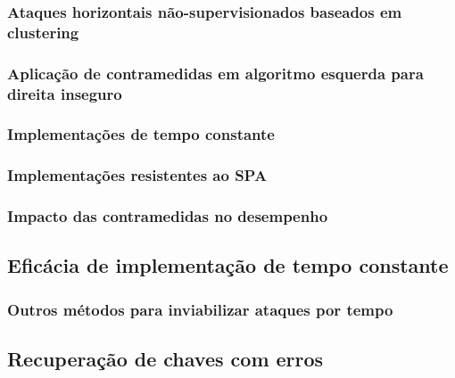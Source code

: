\subsubsection{Ataques horizontais não-supervisionados baseados em clustering}

\subsubsection{Aplicação de contramedidas em algoritmo esquerda para direita
inseguro}

\subsubsection{Implementações de tempo constante}

\subsubsection{Implementações resistentes ao SPA}

\subsubsection{Impacto das contramedidas no desempenho}

\subsection{Eficácia de implementação de tempo constante}

\subsubsection{Outros métodos para inviabilizar ataques por tempo}

\subsection{Recuperação de chaves com erros}

